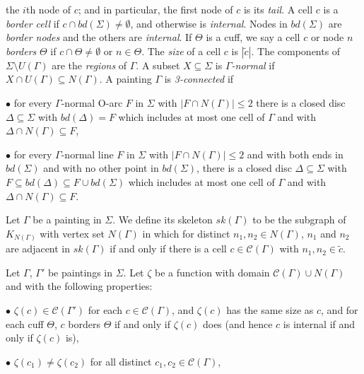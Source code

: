 \noindent the $i$th node of $c$; and in particular, the first node of $c$ is its \textit{tail}. A cell $c$ is a \textit{border cell} if $c \cap bd(\Sigma) \ne \emptyset$, and otherwise is \textit{internal}. Nodes in $bd(\Sigma)$ are \textit{border nodes} and the others are \textit{internal}. If $\Theta$ is a cuff, we say a cell $c$ or node $n$ \textit{borders} $\Theta$ if $c \cap \Theta \ne \emptyset$ or $n \in \Theta$. The \textit{size} of a cell $c$ is $|\tilde{c}|$. The components of $\Sigma \setminus U(\Gamma)$ are the \textit{regions} of $\Gamma$. A subset $X \subseteq \Sigma$ is \textit{$\Gamma$-normal} if $X \cap U(\Gamma) \subseteq N(\Gamma)$. A painting $\Gamma$ is \textit{3-connected} if

\hspace*{12pt}$\bullet$ for every $\Gamma$-normal O-arc $F$ in $\Sigma$ with $|F \cap N(\Gamma)| \le 2$ there is a closed disc $\Delta \subseteq \Sigma$ with $bd(\Delta) = F$ which includes at most one cell of $\Gamma$ and with $\Delta \cap N(\Gamma) \subseteq F$,

\hspace*{12pt}$\bullet$ for every $\Gamma$-normal line $F$ in $\Sigma$ with $|F \cap N(\Gamma)| \le 2$ and with both ends in $bd(\Sigma)$ and with no other point in $bd(\Sigma)$, there is a closed disc $\Delta \subseteq \Sigma$ with $F \subseteq bd(\Delta) \subseteq F \cup bd(\Sigma)$ which includes at most one cell of $\Gamma$ and with $\Delta \cap N(\Gamma) \subseteq F$.

Let $\Gamma$ be a painting in $\Sigma$. We define its skeleton $sk(\Gamma)$ to be the subgraph of $K_{N(\Gamma)}$ with vertex set $N(\Gamma)$ in which for distinct $n_1, n_2 \in N(\Gamma)$, $n_1$ and $n_2$ are adjacent in $sk(\Gamma)$ if and only if there is a cell $c \in \mathcal{C}(\Gamma)$ with $n_1, n_2 \in \tilde{c}$.

Let $\Gamma$, $\Gamma'$ be paintings in $\Sigma$. Let $\zeta$ be a function with domain $\mathcal{C}(\Gamma) \cup N(\Gamma)$ and with the following properties:

\hspace*{12pt}$\bullet$ $\zeta(c) \in \mathcal{C}(\Gamma')$ for each $c \in \mathcal{C}(\Gamma)$, and $\zeta(c)$ has the same size as $c$, and for each cuff $\Theta$, $c$ borders $\Theta$ if and only if $\zeta(c)$ does (and hence $c$ is internal if and only if $\zeta(c)$ is),

\hspace*{12pt}$\bullet$ $\zeta(c_1) \ne \zeta(c_2)$ for all distinct $c_1, c_2 \in \mathcal{C}(\Gamma)$,

